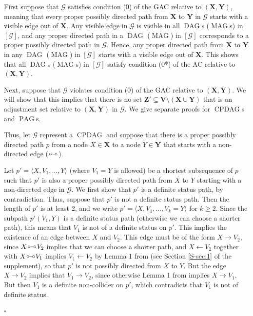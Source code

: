\documentclass[]{article}
\DeclareMathOperator{\CPDAG}{CPDAG}
\DeclareMathOperator{\DAG}{DAG}
\DeclareMathOperator{\MAG}{MAG}
\DeclareMathOperator{\PAG}{PAG}
\newenvironment{proofsketchamenab}{\noindent{\bf Proof of Lemma \ref{lemmaadjamengen}:}}%
{\hfill $\square$}
\theoremstyle{definition}
\theoremstyle{remark}
\newcommand{\vars}[1][V]{\mathbf{#1}}
\newcommand{\g}[1][G]{\mathcal{#1}}
\newcommand{\circcirc}{
  \setlength{\unitlength}{1mm}
  \begin{picture}(5,1)(0,0)
    \put(1,1){\circle{1}}
    \put(1.5,1){\line(1,0){2}}
    \put(4,1){\circle{1}}
  \end{picture}
}
\begin{document}
\begin{proofsketchamenab}
   First suppose that $\g$ satisfies condition (0) of the GAC relative to $(\mathbf{X},\mathbf{Y})$, meaning that every proper possibly directed path from $\mathbf{X}$ to $\mathbf{Y}$ in $\g$ starts with a visible edge out of $\mathbf{X}$. Any visible edge in $\g$ is visible in all $\DAG$s ($\MAG$s) in $[\g]$, and any proper directed path in a $\DAG$ ($\MAG$) in $[\g]$ corresponds to a proper possibly directed path in $\g$. Hence, any proper directed path from $\mathbf{X}$ to $\mathbf{Y}$ in any $\DAG$ ($\MAG$) in $[\g]$ starts with a visible edge out of $\mathbf{X}$. This shows that all $\DAG$s ($\MAG$s) in $[\g]$ satisfy condition (0*) of the AC relative to $(\mathbf{X},\mathbf{Y})$.

   Next, suppose that $\g$ violates condition (0) of the GAC relative to $(\mathbf{X},\mathbf{Y})$. We will show that this implies that there is no set $\mathbf{Z}' \subseteq  \vars \setminus (\mathbf{X} \cup \mathbf{Y})$ that is an adjustment set relative to $(\mathbf{X},\mathbf{Y})$ in $\g$.
   We give separate proofs for $\CPDAG$s and $\PAG$s.

   Thus, let $\g$ represent a $\CPDAG$ and suppose that there is a proper possibly directed path $p$ from a node $X \in \mathbf{X}$ to a node $Y \in \mathbf{Y}$ that starts with a non-directed edge ($\circcirc$).

   Let $p' = \langle X, V_1,\dots, Y \rangle$ (where $V_1 = Y$ is allowed) be a shortest subsequence of $p$ such that $p'$ is also a proper possibly directed path from $X$ to $Y$ starting with a non-directed edge in $\g$. We first show that $p'$ is a definite status path, by contradiction. Thus, suppose that $p'$ is not a definite status path. Then the length of $p'$ is at least 2, and we write $p' = \langle X,V_1,\dots,V_k=Y\rangle$ for $k\ge 2$. Since the subpath $p'(V_1,Y)$ is a definite status path (otherwise we can choose a shorter path), this means that $V_1$ is not of a definite status on $p'$. This implies the existence of an edge between $X$ and $V_2$. This edge must be of the form $X \to V_2$, since $X \circcirc V_2$ implies that we can choose a shorter path, and $X \leftarrow V_2$ together with $X \circcirc V_1$ implies $V_1 \leftarrow V_2$  by Lemma 1 from \citet{meek1995causal} (see Section \ref{S-sec:1} of the supplement), so that $p'$ is not possibly directed from $X$ to $Y$. But the edge $X \to V_2$ implies that $V_1 \to V_2$, since otherwise Lemma 1 from \citet{meek1995causal} implies $X \to V_1$. But then $V_1$ is a definite non-collider on $p'$, which contradicts that $V_1$ is not of definite status.


\end{proofsketchamenab}
\end{document}
